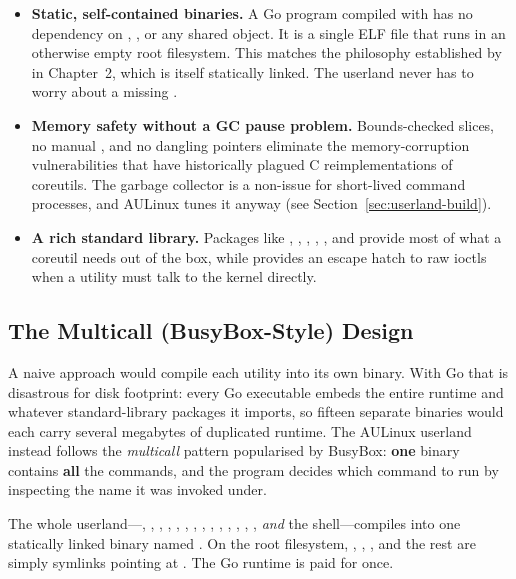 \begin{itemize}
  \item \textbf{Static, self-contained binaries.} A Go program compiled with
         has no dependency on , ,
        or any shared object. It is a single ELF file that runs in an otherwise
        empty root filesystem. This matches the philosophy established by
         in Chapter~2, which is itself statically linked. The
        userland never has to worry about a missing .
  \item \textbf{Memory safety without a GC pause problem.} Bounds-checked
        slices, no manual , and no dangling pointers eliminate the
        memory-corruption vulnerabilities that have historically plagued
        C reimplementations of coreutils. The garbage collector is a non-issue
        for short-lived command processes, and AULinux tunes it anyway (see
        Section~\ref{sec:userland-build}).
  \item \textbf{A rich standard library.} Packages like , ,
        , , , and
         provide most of what a coreutil needs out of the
        box, while  provides an escape hatch to raw ioctls when a
        utility must talk to the kernel directly.
\end{itemize}

\subsection{The Multicall (BusyBox-Style) Design}

A naive approach would compile each utility into its own binary. With Go that is
disastrous for disk footprint: every Go executable embeds the entire runtime and
whatever standard-library packages it imports, so fifteen separate binaries would
each carry several megabytes of duplicated runtime. The AULinux userland instead
follows the \emph{multicall} pattern popularised by BusyBox: \textbf{one} binary
contains \textbf{all} the commands, and the program decides which command to run
by inspecting the name it was invoked under.

\begin{infobox}
The whole userland---, , , , ,
, , , , , ,
, , , \emph{and} the 
shell---compiles into one statically linked binary named . On the
root filesystem, , , , and the rest
are simply symlinks pointing at . The Go runtime is paid for once.
\end{infobox}

